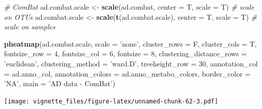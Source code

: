 \documentclass[]{book}
\newenvironment{Shaded}{\begin{snugshade}}{\end{snugshade}}
\newcommand{\KeywordTok}[1]{\textcolor[rgb]{0.13,0.29,0.53}{\textbf{#1}}}
\newcommand{\DataTypeTok}[1]{\textcolor[rgb]{0.13,0.29,0.53}{#1}}
\newcommand{\DecValTok}[1]{\textcolor[rgb]{0.00,0.00,0.81}{#1}}
\newcommand{\StringTok}[1]{\textcolor[rgb]{0.31,0.60,0.02}{#1}}
\newcommand{\CommentTok}[1]{\textcolor[rgb]{0.56,0.35,0.01}{\textit{#1}}}
\newcommand{\NormalTok}[1]{#1}
\begin{document}
\begin{Shaded}
\begin{Highlighting}[]
\CommentTok{# ComBat}
\NormalTok{ad.combat.scale <-}\StringTok{ }\KeywordTok{scale}\NormalTok{(ad.combat, }\DataTypeTok{center =}\NormalTok{ T, }\DataTypeTok{scale =}\NormalTok{ T) }\CommentTok{# scale on OTUs}
\NormalTok{ad.combat.scale <-}\StringTok{ }\KeywordTok{scale}\NormalTok{(}\KeywordTok{t}\NormalTok{(ad.combat.scale), }\DataTypeTok{center =}\NormalTok{ T, }\DataTypeTok{scale =}\NormalTok{ T) }\CommentTok{# scale on samples}

\KeywordTok{pheatmap}\NormalTok{(ad.combat.scale, }
         \DataTypeTok{scale =} \StringTok{'none'}\NormalTok{, }
         \DataTypeTok{cluster_rows =}\NormalTok{ F, }
         \DataTypeTok{cluster_cols =}\NormalTok{ T, }
         \DataTypeTok{fontsize_row =} \DecValTok{4}\NormalTok{, }\DataTypeTok{fontsize_col =} \DecValTok{6}\NormalTok{,}
         \DataTypeTok{fontsize =} \DecValTok{8}\NormalTok{,}
         \DataTypeTok{clustering_distance_rows =} \StringTok{'euclidean'}\NormalTok{,}
         \DataTypeTok{clustering_method =} \StringTok{'ward.D'}\NormalTok{,}
         \DataTypeTok{treeheight_row =} \DecValTok{30}\NormalTok{,}
         \DataTypeTok{annotation_col =}\NormalTok{ ad.anno_col,}
         \DataTypeTok{annotation_colors =}\NormalTok{ ad.anno_metabo_colors,}
         \DataTypeTok{border_color =} \StringTok{'NA'}\NormalTok{,}
         \DataTypeTok{main =} \StringTok{'AD data - ComBat'}\NormalTok{)}
\end{Highlighting}
\end{Shaded}

\texttt{[image: vignette\_files/figure-latex/unnamed-chunk-62-3.pdf]}
\end{document}
